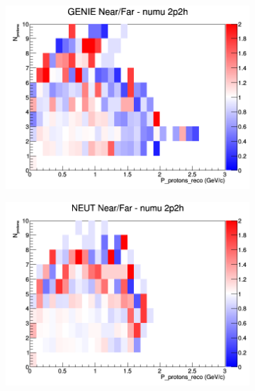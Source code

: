 \documentclass[12pt]{article}
\begin{document}
\begin{figure}[h]
\begin{subfigure}[b]{0.32\textwidth}
\includegraphics[width=\linewidth]{eff_N_P/LAr/protons/ratios/2p2h_GENIE_numu_NF_N_P.png}
\end{subfigure}
\begin{subfigure}[b]{0.32\textwidth}
\includegraphics[width=\linewidth]{eff_N_P/LAr/protons/ratios/2p2h_NEUT_numu_NF_N_P.png}
\end{subfigure}
\begin{subfigure}[b]{0.32\textwidth}

\end{subfigure}
\end{figure}
\end{document}
